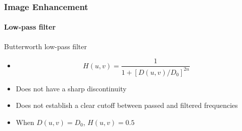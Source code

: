 \documentclass{beamer}
\begin{document}
\begin{frame}
\frametitle{Image Enhancement}
\framesubtitle{Low-pass filter}
\begin{block}{Butterworth low-pass filter}
\scriptsize{
\begin{itemize}
\item[] 	$$ H(u,v) = \frac{1}{1+[D(u,v)/D_{0}]^{2n}}$$

\item Does not have a sharp discontinuity
\item Does not establish a clear cutoff between passed and filtered frequencies
\item When $D(u,v) = D_{0}$, $H(u,v) = 0.5$\\
\end{itemize}
}
\end{block}
\end{frame}
\end{document}

